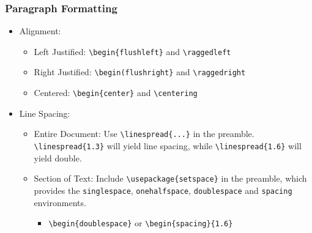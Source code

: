 \documentclass{beamer}
\begin{document}
\begin{frame}[containsverbatim]
    \frametitle{Paragraph Formatting}
    \begin{itemize}
        \item Alignment:
            \begin{itemize}
                \item Left Justified: \verb|\begin{flushleft}| and \verb|\raggedleft|
                \item Right Justified: \verb|\begin(flushright}| and \verb|\raggedright|
                \item Centered: \verb|\begin{center}| and \verb|\centering|
            \end{itemize}
        \item Line Spacing:
            \begin{itemize}
                \item Entire Document: Use \verb|\linespread{...}| in the preamble. \verb|\linespread{1.3}| will yield  line spacing, while \verb|\linespread{1.6}| will yield double.
                \item Section of Text: Include \verb|\usepackage{setspace}| in the preamble, which provides the \verb|singlespace|, \verb|onehalfspace|, \verb|doublespace| and \verb|spacing| environments.
                    \begin{itemize}
                    \item \verb|\begin{doublespace}| or \verb|\begin{spacing}{1.6}|
                    \end{itemize}
            \end{itemize}
    \end{itemize}
\end{frame}
\end{document}
